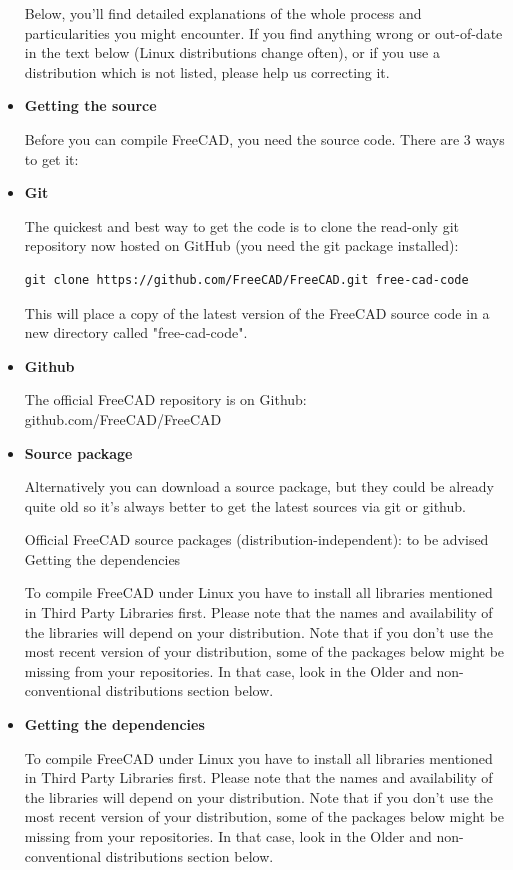 \begin{itemize}
Below, you'll find detailed explanations of the whole process and particularities you might encounter. If you find anything wrong or out-of-date in the text below (Linux distributions change often), or if you use a distribution which is not listed, please help us correcting it.

\item
\textbf{Getting the source}

Before you can compile FreeCAD, you need the source code. There are 3 ways to get it:

\item 
\textbf{Git}

The quickest and best way to get the code is to clone the read-only git repository now hosted on GitHub (you need the git package installed):

\begin{verbatim}
git clone https://github.com/FreeCAD/FreeCAD.git free-cad-code
\end{verbatim}

This will place a copy of the latest version of the FreeCAD source code in a new directory called "free-cad-code".

\item
\textbf{Github}

The official FreeCAD repository is on Github: github.com/FreeCAD/FreeCAD

\item
\textbf{Source package}

Alternatively you can download a source package, but they could be already quite old so it's always better to get the latest sources via git or github.

Official FreeCAD source packages (distribution-independent): to be advised
Getting the dependencies

To compile FreeCAD under Linux you have to install all libraries mentioned in Third Party Libraries first. Please note that the names and availability of the libraries will depend on your distribution. Note that if you don't use the most recent version of your distribution, some of the packages below might be missing from your repositories. In that case, look in the Older and non-conventional distributions section below.

\item 
\textbf{Getting the dependencies}

To compile FreeCAD under Linux you have to install all libraries mentioned in Third Party Libraries first. Please note that the names and availability of the libraries will depend on your distribution. Note that if you don't use the most recent version of your distribution, some of the packages below might be missing from your repositories. In that case, look in the Older and non-conventional distributions section below.


\end{itemize}
